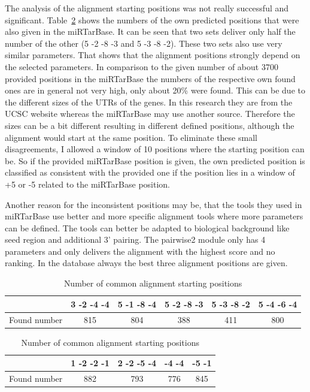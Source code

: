 \documentclass[12pt]{article}
\begin{document}
The analysis of the alignment starting positions was not really successful and significant. Table~\ref{tab:positions} shows the numbers of the own predicted positions that were also given in the miRTarBase. It can be seen that two sets deliver only half the number of the other (5 -2 -8 -3 and 5 -3 -8 -2). These two sets also use very similar parameters. That shows that the alignment positions strongly depend on the selected parameters. In comparison to the given number of about 3700 provided positions in the miRTarBase the numbers of the respective own found ones are in general not very high, only about 20\% were found. This can be due to the different sizes of the UTRs of the genes. In this research they are from the UCSC website whereas the miRTarBase may use another source. Therefore the sizes can be a bit different resulting in different defined positions, although the alignment would start at the same position. To eliminate these small disagreements, I allowed a window of 10 positions where the starting position can be. So if the provided miRTarBase position is given, the own predicted position is classified as consistent with the provided one if the position lies in a window of +5 or -5 related to the miRTarBase position. 

Another reason for the inconsistent positions may be, that the tools they used in miRTarBase use better and more specific alignment tools where more parameters can be defined. The tools can better be adapted to biological background like seed region and additional 3' pairing. The pairwise2 module only has 4 parameters and only delivers the alignment with the highest score and no ranking. In the database always the best three alignment positions are given.  \\


\begin{table}
\caption{Number of common alignment starting positions}
\vspace{0.3cm}
\begin{tabular}{c||c|c|c|c|c} 
& 3 -2 -4 -4 & 5 -1 -8 -4 & 5 -2 -8 -3 & 5 -3 -8 -2 & 5 -4 -6 -4  \\
\hline\hline
Found number & 815 & 804 & 388 & 411 & 800\\
\hline
\end{tabular}
\vspace{0.5cm}

\begin{tabular}{c||c|c|c|c}
& 1 -2 -2 -1 & 2 -2 -5 -4 & -4 -4 & -5 -1 \\
\hline\hline
Found number & 882 & 793 & 776 & 845  \\
\hline
\end{tabular}
\label{tab:positions}
\end{table}
\end{document}
